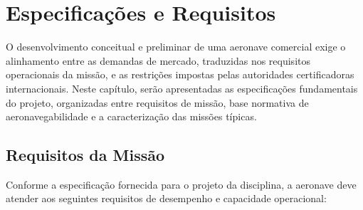 \chapter{Especificações e Requisitos}

O desenvolvimento conceitual e preliminar de uma aeronave comercial exige o alinhamento entre as demandas de mercado, traduzidas nos requisitos operacionais da missão, e as restrições impostas pelas autoridades certificadoras internacionais. Neste capítulo, serão apresentadas as especificações fundamentais do projeto, organizadas entre requisitos de missão, base normativa de aeronavegabilidade e a caracterização das missões típicas.

\section{Requisitos da Missão}
\label{section:Requisitos}

Conforme a especificação fornecida para o projeto da disciplina, a aeronave deve atender aos seguintes requisitos de desempenho e capacidade operacional:

